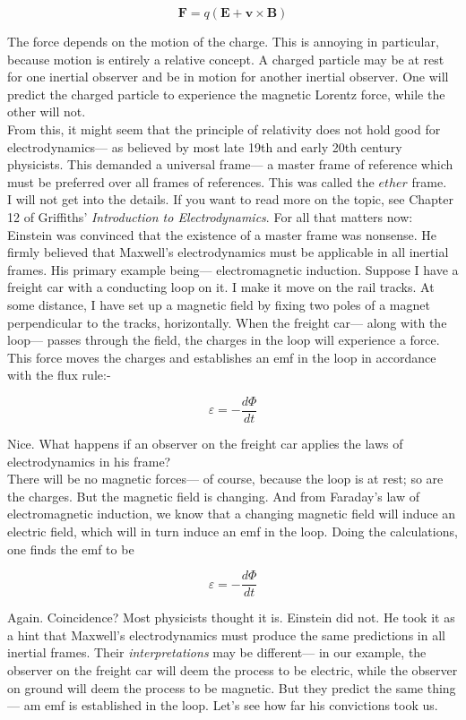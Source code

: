 \documentclass[12pt]{article}
\begin{document}
\[\mathbf{F} = q(\mathbf{E}+\mathbf{v}\times\mathbf{B})\]

The force depends on the motion of the charge. This is annoying in particular, because motion is entirely a relative concept.
A charged particle may be at rest for one inertial observer and be in motion for another inertial observer. One will 
predict the charged particle to experience the magnetic Lorentz force, while the other will not.\\
From this, it might seem that the principle of relativity does not hold good for electrodynamics--- as believed by most late 19th and early 20th century physicists. 
This demanded a universal frame--- a master frame of reference which must be preferred over all frames of references. 
This was called the $ether$ frame.\\ 
I will not get into the details. If you want to read more on the topic, see Chapter 12 of Griffiths' \textit{Introduction to Electrodynamics}. 
For all that matters now: Einstein was convinced that the existence of a master frame was nonsense. He firmly believed that Maxwell's electrodynamics 
must be applicable in all inertial frames. His primary example being--- electromagnetic induction. Suppose I have a freight car with a conducting loop on it. I make it 
move on the rail tracks. At some distance, I have set up a magnetic field by fixing two poles of a magnet perpendicular to the tracks, horizontally. 
When the freight car--- along with the loop--- passes through the field, the charges in the loop will experience a force. This force moves the charges 
and establishes an emf in the loop in accordance with the flux rule:-

\[\varepsilon = - \frac{d\Phi}{dt}\]

Nice. What happens if an observer on the freight car applies the laws of electrodynamics in his frame? \\
There will be no magnetic forces--- of course, because the loop is at rest; so are the charges. But the magnetic field is changing. 
And from Faraday's law of electromagnetic induction, we know that a changing magnetic field will induce an electric field, which will in turn induce an emf in the loop. 
Doing the calculations, one finds the emf to be 

\[\varepsilon = - \frac{d\Phi}{dt}\]

Again. Coincidence? Most physicists thought it is. Einstein did not. He took it as a hint that Maxwell's electrodynamics must produce the same 
predictions in all inertial frames. Their \textit{interpretations} may be different--- in our example, the observer on the freight car will deem the process to be electric, while the observer 
on ground will deem the process to be magnetic. But they predict the same thing--- am emf is established in the 
loop. Let's see how far his convictions took us.\\
\end{document}

